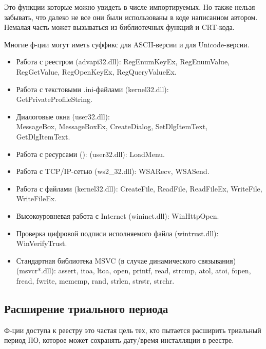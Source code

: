 Это функции которые можно увидеть в числе импортируемых.
Но также нельзя забывать, что далеко не все они были использованы в коде написанном автором.
Немалая часть может вызываться из библиотечных функций и \ac{CRT}-кода.
	
Многие ф-ции могут иметь суффикс  для ASCII-версии и  для Unicode-версии.

\begin{itemize}

\item
Работа с реестром (advapi32.dll): 
RegEnumKeyEx, RegEnumValue, RegGetValue, RegOpenKeyEx, RegQueryValueEx.

\item
Работа с текстовыми .ini-файлами (kernel32.dll):\\
GetPrivateProfileString.

\item
Диалоговые окна (user32.dll):\\
MessageBox, MessageBoxEx, CreateDialog, SetDlgItemText, GetDlgItemText.

\item
Работа с ресурсами (): (user32.dll):
LoadMenu.

\item
Работа с TCP/IP-сетью (ws2\_32.dll):
WSARecv, WSASend.

\item
Работа с файлами (kernel32.dll):
CreateFile, ReadFile, ReadFileEx, WriteFile, WriteFileEx.

\item
Высокоуровневая работа с Internet
(wininet.dll):
WinHttpOpen.

\item
Проверка цифровой подписи исполняемого файла (wintrust.dll):
WinVerifyTrust.

\item
Стандартная библиотека MSVC (в случае динамического связывания)%
 (msvcr*.dll):
assert, itoa, ltoa, open, printf, read, strcmp, atol, atoi, fopen, fread, fwrite, memcmp, rand,
strlen, strstr, strchr.

\end{itemize}

\subsection{Расширение триального периода}

Ф-ции доступа к реестру это частая цель тех, кто пытается расширить триальный период ПО, которое
может сохранять дату/время инсталляции в реестре.

